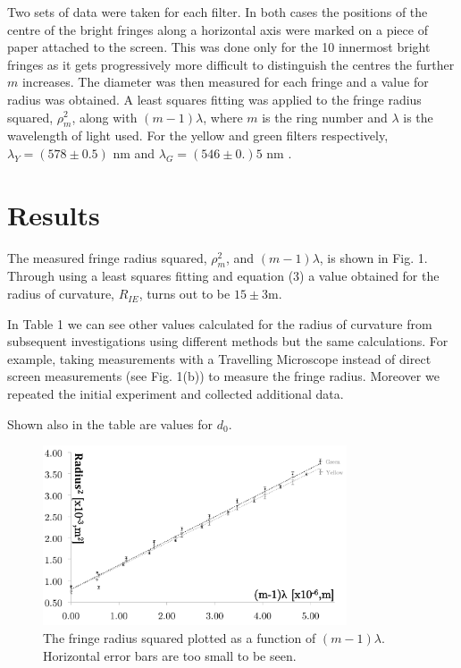 \documentclass[twocolumn]{revtex4}
\begin{document}
Two sets of data were taken for each filter. In both cases the positions of the centre of the bright fringes along a horizontal axis were marked on a piece of paper attached to the screen. This was done only for the 10 innermost bright fringes as it gets progressively more difficult to distinguish the centres the further $m$ increases. The diameter was then measured for each fringe and a value for radius was obtained. A least squares fitting was applied to the fringe radius squared, $\rho_m^2$, along with $(m-1)\lambda$, where $m$ is the ring number and $\lambda$ is the wavelength of light used. For the yellow and green filters respectively, $\lambda_Y = (578\pm0.5)$ nm and $\lambda_G = (546 \pm 0.)5$ nm \cite{labscript}.

\vspace{-3ex}
\section{Results}
\vspace{-2ex}

The measured fringe radius squared, $\rho_m^2$, and $(m-1)\lambda$, is shown in Fig. 1. Through using a least squares fitting and equation (3) a value obtained for the radius of curvature, $R_{IE}$, turns out to be $15\pm3$m. 

In Table 1 we can see other values calculated for the radius of curvature from subsequent investigations using different methods but the same calculations. For example, taking measurements with a Travelling Microscope instead of direct screen measurements (see Fig. 1(b)) to measure the fringe radius. Moreover we repeated the initial experiment and collected additional data.  

Shown also in the table are values for $d_0$. 
\vspace{-1ex}
\begin{figure}[!h]
\begin{center}
\includegraphics[width=9cm]{fig2}
\caption[]{The fringe radius squared plotted as a function of $(m-1)\lambda$. Horizontal error bars are too small to be seen.}
\label{fig:fig2}
\end{center}
\end{figure}
\end{document}
